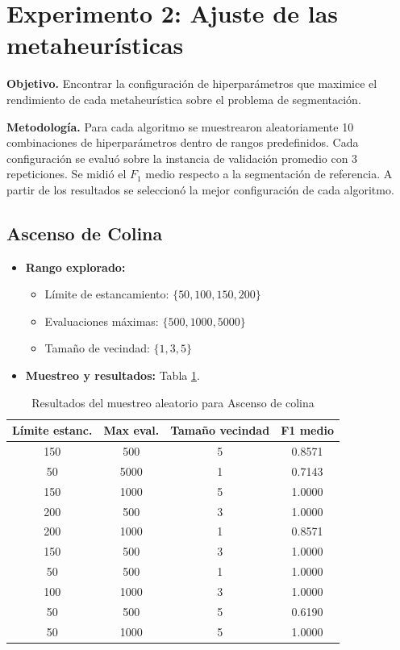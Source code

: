 \documentclass[letterpaper, 12pt]{report}
\begin{document}
\section{Experimento 2: Ajuste de las metaheurísticas}

\medskip
\noindent
\textbf{Objetivo.}
Encontrar la configuración de hiperparámetros que maximice el rendimiento de cada metaheurística sobre el problema de segmentación.

\medskip
\noindent
\textbf{Metodología.}
Para cada algoritmo se muestrearon aleatoriamente 10 combinaciones de hiperparámetros dentro de rangos predefinidos. Cada configuración se evaluó sobre la instancia de validación promedio con 3 repeticiones. Se midió el \(F_1\) medio respecto a la segmentación de referencia. A partir de los resultados se seleccionó la mejor configuración de cada algoritmo.

\subsection{Ascenso de Colina}

\begin{itemize}
    \item \textbf{Rango explorado:}
    \begin{itemize}
        \item Límite de estancamiento: \(\{50, 100, 150, 200\}\)
        \item Evaluaciones máximas: \(\{500, 1000, 5000\}\)
        \item Tamaño de vecindad: \(\{1, 3, 5\}\)
    \end{itemize}
    \item \textbf{Muestreo y resultados:} Tabla \ref{tab:hc_results}.
\end{itemize}

\begin{table}[H]
\centering
\caption{Resultados del muestreo aleatorio para Ascenso de colina}
\label{tab:hc_results}
\begin{tabular}{cccc}
\toprule
\textbf{Límite estanc.} & \textbf{Max eval.} & \textbf{Tamaño vecindad} & \textbf{F1 medio} \\
\midrule
150 & 500 & 5 & 0.8571 \\
50 & 5000 & 1 & 0.7143 \\
150 & 1000 & 5 & 1.0000 \\
200 & 500 & 3 & 1.0000 \\
200 & 1000 & 1 & 0.8571 \\
150 & 500 & 3 & 1.0000 \\
50 & 500 & 1 & 1.0000 \\
100 & 1000 & 3 & 1.0000 \\
50 & 500 & 5 & 0.6190 \\
50 & 1000 & 5 & 1.0000 \\
\bottomrule
\end{tabular}
\end{table}
\end{document}
